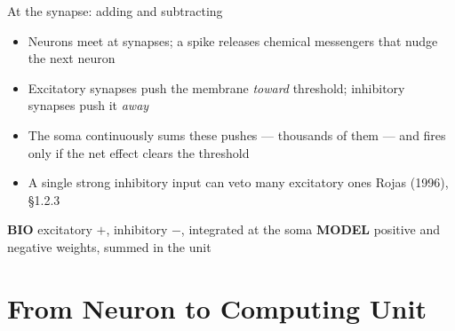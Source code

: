 \documentclass[aspectratio=169, 11pt]{beamer}
\newcommand{\biomodel}[2]{%
  \vfill
  {\footnotesize
  \begin{tcolorbox}[enhanced, sidebyside, sidebyside align=top,
                    lefthand ratio=0.485,
                    segmentation style={shc!35, line width=0.6pt},
                    colback=shc!5, colframe=shc!35, boxrule=0.5pt,
                    arc=1.5mm, left=2mm, right=2mm, top=0.8mm, bottom=0.8mm]
    {\color{shc}\textbf{BIO}}\;\; #1
  \tcblower
    {\color{dpc}\textbf{MODEL}}\;\; #2
  \end{tcolorbox}}%
  \vspace{0.6em}%
}
\newcommand{\src}[3]{}      %
\begin{document}
\begin{frame}{At the synapse: adding and subtracting}
  \src{rojas1996}{section}{1.2.3}
  \begin{itemize}
    \item Neurons meet at \alert{synapses}; a spike releases
          chemical messengers that nudge the next neuron
    \item \alert{Excitatory} synapses push the membrane
          \emph{toward} threshold; \alert{inhibitory} synapses
          push it \emph{away}
    \item The soma continuously \alert{sums} these pushes ---
          thousands of them --- and fires only if the net
          effect clears the threshold
    \item A single strong inhibitory input can \alert{veto}
          many excitatory ones
          \hfill{\scriptsize Rojas (1996), \S1.2.3}
  \end{itemize}
  \biomodel{excitatory $+$, inhibitory $-$, integrated at the
            soma}
           {positive and negative \alert{weights}, summed in
            the unit}
\end{frame}

\section{From Neuron to Computing Unit}
\end{document}

